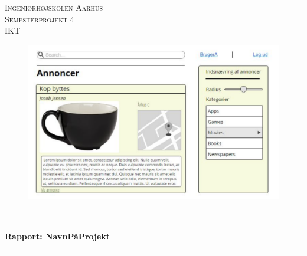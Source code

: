 \begin{titlepage}
		
		\newcommand{\HRule}{\rule{\linewidth}{0.5mm}} %
		
		\center %
		
		
		\textsc{\LARGE Ingeniørhøjskolen Aarhus}\\[1cm] %
		\textsc{\Large Semesterprojekt 4}\\[0.5cm] %
		\textsc{\large IKT}\\[0.5cm] %
		
		\begin{figure}[ht!]
			\centering
			\includegraphics[width=120mm]{figures/forside.pdf}
		\end{figure}
		
		
		\HRule \\[0.4cm]
		{ \huge \bfseries Rapport: NavnPåProjekt}\\[0.4cm] %
		\HRule \\[1.2cm]
		
		

\end{titlepage}
